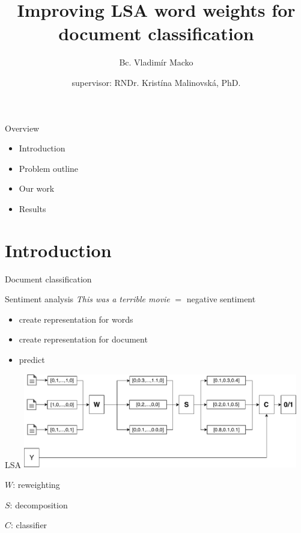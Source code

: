 \documentclass[xcolor={table}]{beamer}
\title[eLSA]{Improving LSA word weights for document classification}
\author[Macko, Malinovska] %
{Bc. Vladimír Macko\inst{1} \\ \and supervisor: RNDr. Kristína Malinovská, PhD.\inst{1}}
\institute[VFU] %
{
  \inst{1}%
  Comenius University\\
  Faculty of Mathematics, Physics and Informatics
}
\begin{document}
        
\begin{frame}
    \titlepage
\end{frame}
    
\begin{frame}{Overview}
    \begin{block}{}
        \begin{itemize}
            \item Introduction
            \item Problem outline
            \item Our work
            \item Results
        \end{itemize}
    \end{block}
\end{frame}

\section{Introduction}
\begin{frame}{Document classification}
    \begin{block}{Sentiment analysis}
        \emph{This was a terrible movie} $=$ negative sentiment
    \end{block}
    
    \begin{block}{}   
        \begin{itemize}
            \item create representation for words
            \item create representation for document
            \item predict
        \end{itemize}
    \end{block}
\end{frame} 

\begin{frame}{LSA}
    \includegraphics[width=0.9\textwidth]{LSA.pdf}
    \begin{block}
        
        $W$: reweighting

        $S$: decomposition
        
        $C$: classifier
    \end{block}
\end{frame}
\end{document}
